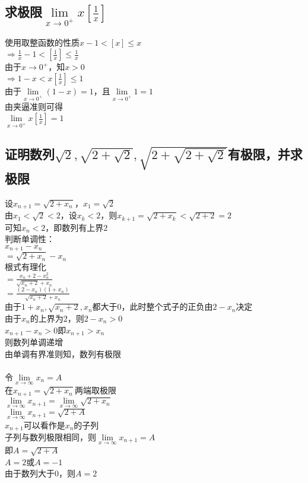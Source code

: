 \documentclass{article}
\begin{document}
\begin{flushleft}
	\subsection{
		求极限$\lim\limits_{x\to 0^+}x[\frac{1}{x}]$
	}
	使用取整函数的性质$x-1<[x]\le x$\\
	$\Rightarrow \frac{1}{x}-1<[\frac{1}{x}]\le \frac{1}{x}$\\
	由于$x\to 0^+$，知$x>0$\\
	$\Rightarrow 1-x<x[\frac{1}{x}]\le 1$\\
	由于$\lim\limits_{x\to 0^+}(1-x)=1$，且$\lim\limits_{x\to 0^+}1=1$\\
	由夹逼准则可得\\
	$\lim\limits_{x\to 0^+}x[\frac{1}{x}]=1$\\
	
	\subsection{
	证明数列$\sqrt{2}, \sqrt{2+\sqrt{2}}, \sqrt{2+\sqrt{2+\sqrt{2}}}$有极限，并求极限
	}
	设$x_{n+1}=\sqrt{2+x_n}$，$x_1=\sqrt{2}$\\
	由$x_1<\sqrt{2}<2$，设$x_k<2$，则$x_{k+1}=\sqrt{2+x_k}<\sqrt{2+2}=2$\\
	可知$x_n<2$，即数列有上界$2$\\
	判断单调性：\\
	$x_{n+1}-x_n$\\
	$=\sqrt{2+x_n}-x_n$\\
	根式有理化\\
	$=\frac{x_n+2-x_n^2}{\sqrt{x_n+2}+x_n}$\\
	$=\frac{(2-x_n)(1+x_n)}{\sqrt{x_n+2}+x_n}$\\
	由于$1+x_n, \sqrt{x_n+2}, x_n$都大于0，此时整个式子的正负由$2-x_n$决定\\
	由于$x_n$的上界为$2$，则$2-x_n>0$\\
	$x_{n+1}-x_n>0$即$x_{n+1}>x_n$\\
	则数列单调递增\\
	由单调有界准则知，数列有极限\\
	~\\
	令$\lim\limits_{x\to\infty}x_n=A$\\
	在$x_{n+1}=\sqrt{2+x_n}$两端取极限\\
	$\lim\limits_{x\to\infty}x_{n+1}=\lim\limits_{x\to\infty}\sqrt{2+x_n}$\\
	$\lim\limits_{x\to\infty}x_{n+1}=\sqrt{2+A}$\\
	$x_{n+1}$可以看作是$x_n$的子列\\
	子列与数列极限相同，则$\lim\limits_{x\to\infty}x_{n+1}=A$\\
	即$A=\sqrt{2+A}$\\
	$A=2$或$A=-1$\\
	由于数列大于0，则$A=2$\\




\end{flushleft}
\end{document}
